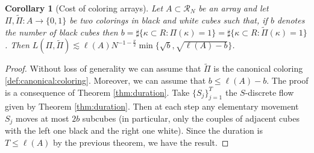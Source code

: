 \documentclass[12 pt]{article}
\theoremstyle{definition} \newtheorem{definition}{Definition}[section]
\theoremstyle{definition} \newtheorem{remark}[definition]{Remark}
\theoremstyle{plain} \newtheorem{lemma}[definition]{Lemma}
\theoremstyle{plain} \newtheorem{proposition}[definition]{Proposition}
\theoremstyle{plain} \newtheorem{theorem}[definition]{Theorem}
\theoremstyle{plain} \newtheorem{corollary}[definition]{Corollary}
\theoremstyle{definition} \newtheorem{example}[definition]{Example}
\theoremstyle{definition} \newtheorem{assumption}[definition]{Assumption}
\theoremstyle{definition} \newtheorem{conjecture}[definition]{Conjecture}
\newcommand{\1}{\mathbbm 1}
\numberwithin{equation}{section}
\begin{document}
\begin{corollary}[Cost of coloring arrays]\label{cor:cost:color}
    Let $A\subset\mathcal{R}_N$ be an array and let $\Pi,\tilde\Pi:A\rightarrow\lbrace 0,1\rbrace$ be two colorings in black and white cubes such that, if $b$ denotes the number of black cubes then $b=\sharp\lbrace\kappa\subset R:\Pi(\kappa)=1\rbrace=\sharp\lbrace\kappa\subset R:\tilde\Pi(\kappa)=1\rbrace$.  Then $L(\Pi,\tilde\Pi)\lesssim \ell(A)N^{-1-\frac{\nu}{2}}\min\lbrace\sqrt{b},\sqrt{\ell(A)-b}\rbrace$.
\end{corollary}
\begin{proof}
    Without loss of generality we can assume that $\tilde\Pi$ is the canonical coloring \ref{def:canonical:coloring}. Moreover, we can assume that $b\leq\ell(A)-b$. The proof is a consequence of Theorem \ref{thm:duration}. Take $\lbrace S_j\rbrace_{j=1}^T$ the $S$-discrete flow given by Theorem \ref{thm:duration}. Then at each step any elementary movement $S_j$ moves at most $2b$ subcubes (in particular, only the couples of adjacent cubes with the left one black and the right one white). 
    Since the duration is $T\leq \ell(A)$ by the previous theorem, we have the result. 
\end{proof}


%
\end{document}
